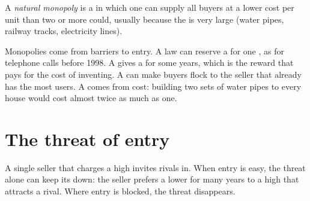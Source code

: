 \begin{definition}\label{def:g8:competition-and-monopoly-first-look:natural-monopoly}
A \emph{natural monopoly} is a  in which one  can supply all
buyers at a lower cost per unit than two or more  could, usually because the  is very
large (water pipes, railway tracks, electricity lines).
\end{definition}

Monopolies come from barriers to entry. A law can reserve a  for one , as for telephone
calls before 1998. A  gives a  for some years, which is the reward that pays for the
cost of inventing. A  can make buyers flock to the seller that already has the most
users. A  comes from cost: building two sets of water pipes to every house would cost
almost twice as much as one.

\section{The threat of entry}

A single seller that charges a high  invites rivals in. When entry is easy, the threat alone can
keep its  down: the seller prefers a lower  for many years to a high  that attracts a
rival. Where entry is blocked, the threat disappears.

